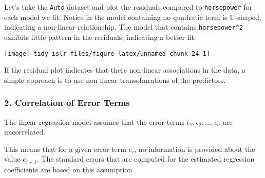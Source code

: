 \documentclass[]{book}
\newenvironment{Shaded}{\begin{snugshade}}{\end{snugshade}}
\newcommand{\DataTypeTok}[1]{\textcolor[rgb]{0.13,0.29,0.53}{#1}}
\newcommand{\DecValTok}[1]{\textcolor[rgb]{0.00,0.00,0.81}{#1}}
\newcommand{\FloatTok}[1]{\textcolor[rgb]{0.00,0.00,0.81}{#1}}
\newcommand{\KeywordTok}[1]{\textcolor[rgb]{0.13,0.29,0.53}{\textbf{#1}}}
\newcommand{\NormalTok}[1]{#1}
\newcommand{\OperatorTok}[1]{\textcolor[rgb]{0.81,0.36,0.00}{\textbf{#1}}}
\newcommand{\StringTok}[1]{\textcolor[rgb]{0.31,0.60,0.02}{#1}}
\begin{document}
Let's take the \texttt{Auto} dataset and plot the residuals compared to \texttt{horsepower} for each model we fit. Notice in the model containing no quadratic term is U-shaped, indicating a non-linear relationship. The model that contains \texttt{horsepower\^{}2} exhibits little pattern in the residuals, indicating a better fit.

\begin{Shaded}
\end{Shaded}

\begin{center}\texttt{[image: tidy\_islr\_files/figure-latex/unnamed-chunk-24-1]} \end{center}

If the residual plot indicates that there non-linear associations in the data, a simple approach is to use non-linear transofmrations of the predictors.

\hypertarget{correlation-of-error-terms}{%
\subsubsection{2. Correlation of Error Terms}\label{correlation-of-error-terms}}

The linear regression model assumes that the error terms \(\epsilon_1,\epsilon_2,...,\epsilon_n\) are uncorrelated.

This means that for a given error term \(e_i\), no information is provided about the value \(e_{i+1}\). The standard errors that are computed for the estimated regression coefficients are based on this assumption.
\end{document}
